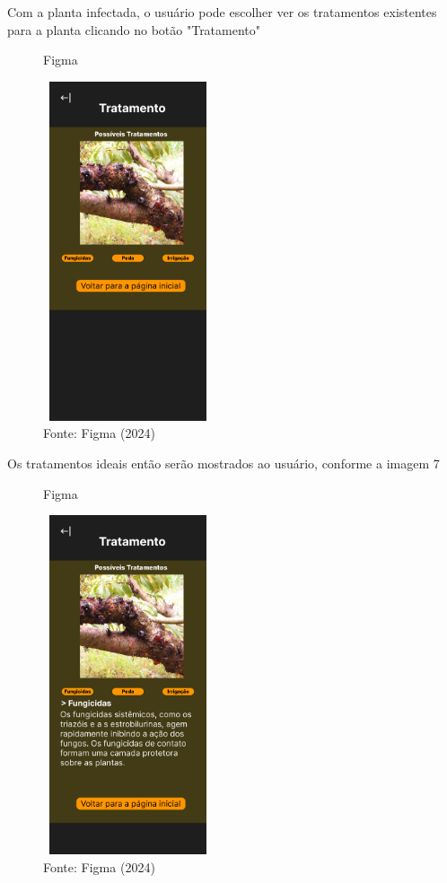 \documentclass[
  a4paper,%
  12pt,%
  english,%
  brazilian,%
]{article}
\begin{document}
Com a planta infectada, o usuário pode escolher ver os tratamentos existentes para a planta clicando no botão "Tratamento"

\begin{figure}[H]
    \centering
    \caption*{Figma}
    \includegraphics[width=5cm,height=10cm]{Illustrations/figma6.png}
    \caption*{Fonte: Figma (2024)}
    \label{fig:fig6}
\end{figure}

Os tratamentos ideais então serão mostrados ao usuário, conforme a imagem 7

\begin{figure}[H]
    \centering
    \caption*{Figma}
    \includegraphics[width=5cm,height=10cm]{Illustrations/figma7.png}
    \caption*{Fonte: Figma (2024)}
    \label{fig:fig7}
\end{figure}
\end{document}

